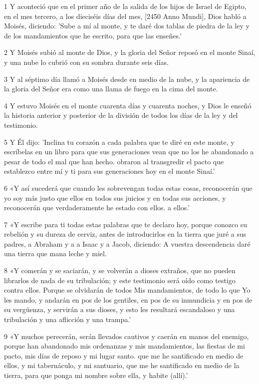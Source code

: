 \par 1 Y aconteció que en el primer año de la salida de los hijos de Israel de Egipto, en el mes tercero, a los dieciséis días del mes, [2450 Anno Mundi], Dios habló a Moisés, diciendo: 'Sube a mí al monte, y te daré dos tablas de piedra de la ley y de los mandamientos que he escrito, para que las enseñes.'
\par 2 Y Moisés subió al monte de Dios, y la gloria del Señor reposó en el monte Sinaí, y una nube lo cubrió con su sombra durante seis días.
\par 3 Y al séptimo día llamó a Moisés desde en medio de la nube, y la apariencia de la gloria del Señor era como una llama de fuego en la cima del monte.
\par 4 Y estuvo Moisés en el monte cuarenta días y cuarenta noches, y Dios le enseñó la historia anterior y posterior de la división de todos los días de la ley y del testimonio.
\par 5 Y Él dijo: 'Inclina tu corazón a cada palabra que te diré en este monte, y escríbelas en un libro para que sus generaciones vean que no los he abandonado a pesar de todo el mal que han hecho. obraron al transgredir el pacto que establezco entre mí y ti para sus generaciones hoy en el monte Sinaí.'
\par 6 «Y así sucederá que cuando les sobrevengan todas estas cosas, reconocerán que yo soy más justo que ellos en todos sus juicios y en todas sus acciones, y reconocerán que verdaderamente he estado con ellos. a ellos.'
\par 7 «Y escribe para ti todas estas palabras que te declaro hoy, porque conozco su rebelión y su dureza de cerviz, antes de introducirlos en la tierra que juré a sus padres, a Abraham y a a Isaac y a Jacob, diciendo: A vuestra descendencia daré una tierra que mana leche y miel.
\par 8 «Y comerán y se saciarán, y se volverán a dioses extraños, que no pueden librarlos de nada de su tribulación; y este testimonio será oído como testigo contra ellos. Porque se olvidarán de todos Mis mandamientos, de todo lo que Yo les mando, y andarán en pos de los gentiles, en pos de su inmundicia y en pos de su vergüenza, y servirán a sus dioses, y esto les resultará escandaloso y una tribulación y una aflicción y una trampa.'
\par 9 «Y muchos perecerán, serán llevados cautivos y caerán en manos del enemigo, porque han abandonado mis ordenanzas y mis mandamientos, las fiestas de mi pacto, mis días de reposo y mi lugar santo. que me he santificado en medio de ellos, y mi tabernáculo, y mi santuario, que me he santificado en medio de la tierra, para que ponga mi nombre sobre ella, y habite (allí).'
